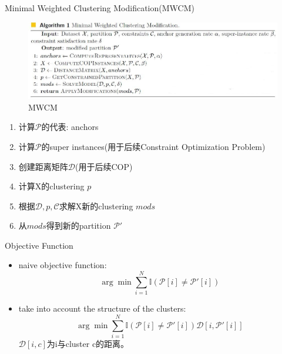 \documentclass{beamer}
\begin{document}
\begin{frame}{Minimal Weighted Clustering Modification(MWCM)}
    \begin{figure}
        \centering
        \includegraphics[width=0.8\linewidth]{./images/mwcm.jpg}
        \caption{MWCM}
        \label{fig:mwcm}
    \end{figure}    
\begin{enumerate}
    \item 计算$\mathcal{P}$的代表: anchors
    \item 计算$\mathcal{P}$的super instances(用于后续Constraint Optimization Problem)
    \item 创建距离矩阵$\mathcal{D}$(用于后续COP)
    \item 计算X的clustering $p$
    \item 根据$\mathcal{D},p,\mathcal{C}$求解X新的clustering $mods$
    \item 从$mods$得到新的partition $\mathcal{P}'$
\end{enumerate}


\end{frame}


\begin{frame}{Objective Function}
    \begin{itemize}
        \item naive objective function:
$$\arg\min\sum\limits_{i=1}^N \mathbb{I}(\mathcal{P}[i]\neq\mathcal{P}'[i])$$

\item take into account the structure of the clusters:
$$\arg\min\sum\limits_{i=1}^N \mathbb{I}(\mathcal{P}[i]\neq\mathcal{P}'[i])\mathcal{D}[i,\mathcal{P}'[i]]$$
$\mathcal{D}[i,c]$为i与cluster c的距离。

    \end{itemize}
    
\end{frame}
\end{document}

